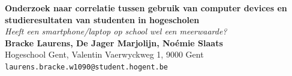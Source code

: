 \documentclass[a0,portrait]{a0poster}
\begin{document}


\begin{minipage}[t]{0.75\linewidth}
\VeryHuge \color{HoGentAccent1} \textbf{Onderzoek naar correlatie tussen gebruik van computer devices en studieresultaten van studenten in hogescholen} \color{Black}\\ %
\Huge\textit{Heeft een smartphone/laptop op school wel een meerwaarde?}\\[2.4cm] %
\huge \textbf{Bracke Laurens, De Jager Marjolijn, Noémie Slaats}\\[0.5cm] %
\huge Hogeschool Gent, Valentin Vaerwyckweg 1, 9000 Gent\\[0.4cm] %
\Large \texttt{laurens.bracke.w1090@student.hogent.be} \\
\end{minipage}
%
\end{document}
